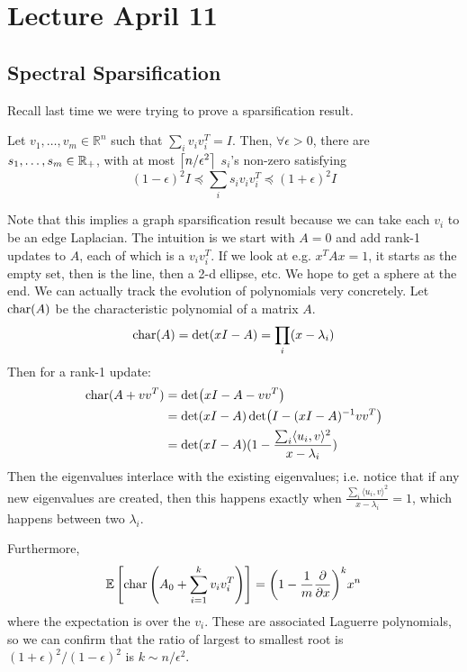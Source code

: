 

\section{Lecture April 11}

\subsection{Spectral Sparsification}
Recall last time we were trying to prove a sparsification result.

\begin{theorem}
    Let $v_1, \dots, v_m \in \mathbb{R}^n$ such that $\sum_i v_i v_i^T  = I$.
    Then, $\forall \epsilon > 0$, there are $s_1, \dots, s_m \in \operatorname{\mathbb{R}}_+$,
    with at most $\left\lceil n/\epsilon^2 \right\rceil$ $s_i$'s non-zero satisfying
    \[ (1 - \epsilon)^2 I \preceq \sum_i s_i v_i v_i^T \preceq (1 + \epsilon)^2 I \]
\end{theorem}

Note that this implies a graph sparsification result because we can take each $v_i$ to be an edge Laplacian.
The intuition is we start with $A = 0$ and add rank-1 updates to $A$, each of which is a $v_i v_i^T$.
If we look at e.g. $x^T A x = 1$, it starts as the empty set, then is the line, then a 2-d ellipse, etc.
We hope to get a sphere at the end. We can actually track the evolution of polynomials very concretely.
Let $\operatorname*{char}(A)$ be the characteristic polynomial of a matrix $A$.
\[ \operatorname*{char}(A) = \det(xI - A) = \prod_i (x - \lambda_i)  \]
Then for a rank-1 update:
\begin{align*}
    \operatorname*{char}(A + vv^T) &= \det(xI - A - vv^T) \\
    &= \det(xI - A) \det(I - (xI - A)^{-1} vv^T) \\
    &= \det(xI - A)( 1 -\frac{\sum_i \langle u_i, v \rangle^2}{x - \lambda_i})
\end{align*}
Then the eigenvalues interlace with the existing eigenvalues; i.e. notice that if any new eigenvalues are created,
then this happens exactly when $\frac{\sum_i \langle u_i, v \rangle^2}{x - \lambda_i} = 1$, which happens between two $\lambda_i$.

Furthermore,
\[ \mathbb{E}\left[ \operatorname*{char}\qty(A_0 + \sum_{i = 1}^{k} v_i v_i^T) \right] = \qty(1 - \frac{1}{m} \pdv{}{x})^k x^n \]
where the expectation is over the $v_i$. These are associated Laguerre polynomials, so we can confirm that the ratio of largest
to smallest root is $(1 + \epsilon)^2/(1 - \epsilon)^2$ is $k \sim n/\epsilon^2$.


